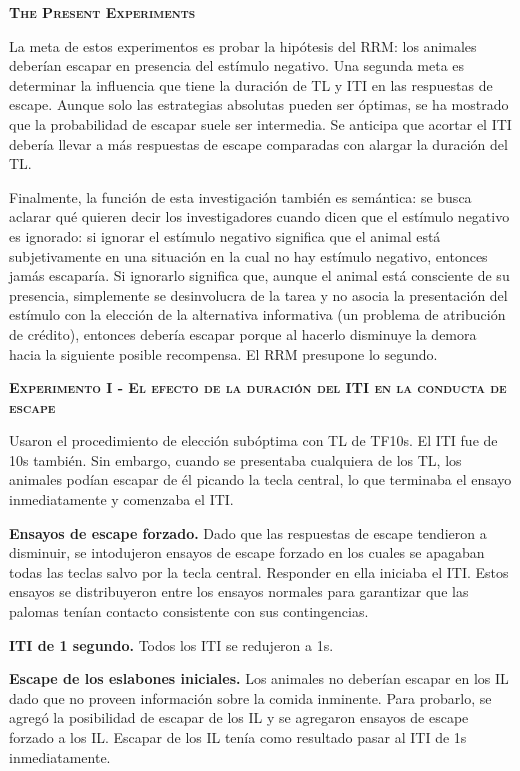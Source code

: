 \documentclass[a4paper,12pt]{article}
\begin{document}
{\scshape\bfseries The Present Experiments}

La meta de estos experimentos es probar la hipótesis del RRM: los animales deberían escapar en presencia del estímulo negativo. Una segunda meta es determinar la influencia que tiene la duración de TL y ITI en las respuestas de escape. Aunque solo las estrategias absolutas pueden ser óptimas, se ha mostrado que la probabilidad de escapar suele ser intermedia. Se anticipa que acortar el ITI debería llevar a más respuestas de escape comparadas con alargar la duración del TL.

Finalmente, la función de esta investigación también es semántica: se busca aclarar qué quieren decir los investigadores cuando dicen que el estímulo negativo es ignorado: si ignorar el estímulo negativo significa que el animal está subjetivamente en una situación en la cual no hay estímulo negativo, entonces jamás escaparía. Si ignorarlo significa que, aunque el animal está consciente de su presencia, simplemente se desinvolucra de la tarea y no asocia la presentación del estímulo con la elección de la alternativa informativa (un problema de atribución de crédito), entonces debería escapar porque al hacerlo disminuye la demora hacia la siguiente posible recompensa. El RRM presupone lo segundo.

{\scshape\bfseries Experimento I - El efecto de la duración del ITI en la conducta de escape}

Usaron el procedimiento de elección subóptima con TL de TF10s. El ITI fue de 10s también. Sin embargo, cuando se presentaba cualquiera de los TL, los animales podían escapar de él picando la tecla central, lo que terminaba el ensayo inmediatamente y comenzaba el ITI.

{\bfseries Ensayos de escape forzado.} Dado que las respuestas de escape tendieron a disminuir, se intodujeron ensayos de escape forzado en los cuales se apagaban todas las teclas salvo por la tecla central. Responder en ella iniciaba el ITI. Estos ensayos se distribuyeron entre los ensayos normales para garantizar que las palomas tenían contacto consistente con sus contingencias.

{\bfseries ITI de 1 segundo.} Todos los ITI se redujeron a 1s.

{\bfseries Escape de los eslabones iniciales.} Los animales no deberían escapar en los IL dado que no proveen información sobre la comida inminente. Para probarlo, se agregó la posibilidad de escapar de los IL y se agregaron ensayos de escape forzado a los IL. Escapar de los IL tenía como resultado pasar al ITI de 1s inmediatamente.
\end{document}
